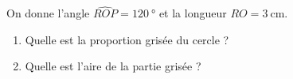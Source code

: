 
\begin{exercice}\label{exo2smath-0267}

    \begin{multicols}{2}
 
        On donne l'angle \( \widehat{ROP}=\SI{120}{\degree}\) et la longueur \( RO=\SI{3}{\centi\meter}\).
    \begin{enumerate}
        \item
    Quelle est la proportion grisée du cercle ?
\item
    Quelle est l'aire de la partie grisée ?
    \end{enumerate}

\columnbreak


\begin{center}
   
\end{center}

    \end{multicols}
    
\end{exercice}
